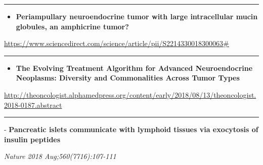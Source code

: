 \documentclass[]{article}
\providecommand{\tightlist}{%
  \setlength{\itemsep}{0pt}\setlength{\parskip}{0pt}}
\begin{document}
\begin{center}\rule{0.5\linewidth}{\linethickness}\end{center}

\begin{itemize}
\tightlist
\item
  \textbf{Periampullary neuroendocrine tumor with large intracellular
  mucin globules, an amphicrine tumor?}
\end{itemize}

\url{https://www.sciencedirect.com/science/article/pii/S2214330018300063\#}

\begin{center}\rule{0.5\linewidth}{\linethickness}\end{center}

\begin{itemize}
\tightlist
\item
  \textbf{The Evolving Treatment Algorithm for Advanced Neuroendocrine
  Neoplasms: Diversity and Commonalities Across Tumor Types}
\end{itemize}

\url{http://theoncologist.alphamedpress.org/content/early/2018/08/13/theoncologist.2018-0187.abstract}

\begin{center}\rule{0.5\linewidth}{\linethickness}\end{center}

 - \textbf{Pancreatic islets communicate with lymphoid tissues via
exocytosis of insulin peptides}

\emph{Nature 2018 Aug;560(7716):107-111}
\end{document}
